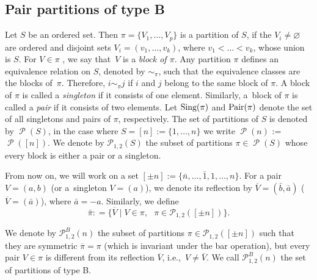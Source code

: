 \documentclass[11pt]{article}
\numberwithin{equation}{section}
\numberwithin{equation}{section}
\def\P{\mathcal{P}}
\def\Pair{\text{\normalfont Pair}}
\def\Sing{\text{\normalfont Sing}}
\DeclareMathOperator{\Part}{\mathcal{P}}
\begin{document}
\setcounter{subsection}{1}\setcounter{Theorem}{2}
\subsection{Pair partitions of type B}

Let $S$ be an ordered set. Then $\pi = \{ V_1,\dots, V_p\}$ is a partition of $S$, if the $V_i \neq \varnothing$ are
ordered and disjoint sets $V_i=(v_1,\dots,v_k)$, where $v_1<\dots<v_k$, whose union is $S$.
For $V \in \pi$ , we say that~$V$ is a \emph{block of $\pi$}.
Any partition $\pi$ defines an equivalence relation on $S$,
denoted by $\sim_\pi$, such that the equivalence classes are the
blocks of~$\pi$.
Therefore, $i\sim_\pi j$ if $i$ and $j$ belong to the same block of $\pi$.
A block of $\pi$ is called a \emph{singleton} if it consists of one element.
Similarly, a~block of $\pi$ is called a \emph{pair} if it consists of two elements.
Let $\Sing(\pi)$ and $\Pair(\pi)$ denote the set of all singletons and pairs of $\pi$, respectively.
The set of partitions of $S$ is denoted by $\Part(S)$, in the case where $S =
[n] := \{1, \dots , n\}$ we write $\Part(n)$ := $\Part([n])$.
We denote by $\P_{1,2}(S)$ the subset of partitions $\pi \in \Part(S)$ whose every block is either a
pair or a singleton.

From now on, we will work on a set $[\pm n]:=\{\bar n, \dots , \bar 1, 1,\dots, n\}$.
For a pair $V=(a,b)$ (or a~singleton $V=(a)$), we denote its reflection by $\overline V=(\bar b , \bar a)$ ($\overline V=( \bar a)$), where $\bar a =-a$.
Similarly, we define
\[
\bar \pi: =\big\{\overline{V}\mid V\in \pi,\text{ } \pi \in \P_{1,2}([\pm n])\big\}.
\]

\begin{Definition} \label{def:partycji}
	We denote by $\P_{1,2}^{B}(n)$ the subset of partitions $\pi \in \P_{1,2}([\pm n])$
	such that they are symmetric $\overline{\pi} =
	\pi$ (which is invariant under the bar operation), but every pair $V \in \pi$ is different from its reflection
	$\overline{V}$, i.e.,~$V \neq \overline{V}$.
	We call $\P_{1,2}^{B}(n)$ the set of partitions of type B.
\end{Definition}
\end{document}
